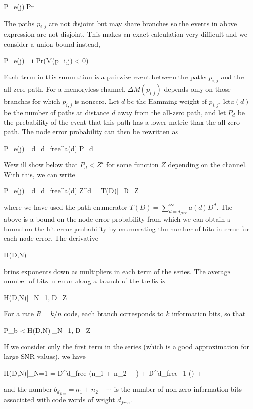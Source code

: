 \bee
P_e(j) \leq Pr 
\eee

The paths $p_{i,j}$ are not disjoint but may share branches so the events in above expression are not disjoint. This makes an exact calculation very difficult and we consider a union bound instead,

\bee
P_e(j) \leq \sum_i Pr(\Delta M(p_{i,j}) < 0)
\eee

Each term in this summation is a pairwise event between the paths $p_{i,j}$ and the all-zero path. For a memoryless channel, $\Delta M(p_{i,j})$ depends only on those branches for which $p_{i,j}$ is nonzero. Let $d$ be the Hamming weight of $p_{i,j}$, let$a(d)$ be the number of paths at distance $d$ away from the all-zero path, and let $P_d$ be the probability of the event that this path has a lower metric than the all-zero path. The node error probability can then be rewritten as

\bee
P_e(j) \leq \sum_{d=d_{free}}^\infty a(d) P_d
\eee

Wew ill show below that $P_d < Z^d$ for some function $Z$ depending on the channel. With this, we can write

\bee
P_e(j) \leq \sum_{d=d_{free}}^\infty a(d) Z^d = T(D)|_{D=Z}
\eee

where we have used the path enumerator $T(D) = \sum_{d=d_{free}}^\infty a(d) D^d$. The above is a bound on the node error probability from which we can obtain a bound on the bit error probability by enumerating the number of bits in error for each node error. The derivative

\bee
{} H(D,N)
\eee

brins exponents down as multipliers in each term of the series. The average number of bits in error along a branch of the trellis is

\bee
{} H(D,N)|_{N=1, D=Z}
\eee

For a rate $R=k/n$ code, each branch corresponds to $k$ information bits, so that

\bee
P_b <   H(D,N)|_{N=1, D=Z}
\eee

If we consider only the first term in the series (which is a good approximation for large SNR values), we have

\bee
{} H(D,N)|_{N=1} = D^{d_{free}} (n_1 + n_2 + \cdots ) + D^{d_{free}+1} (\cdots) + \cdots
\eee

and the number $b_{d_{free}} = n_1 + n_2 + \cdots$ is the number of non-zero information bits associated with code words of weight $d_{free}$.


